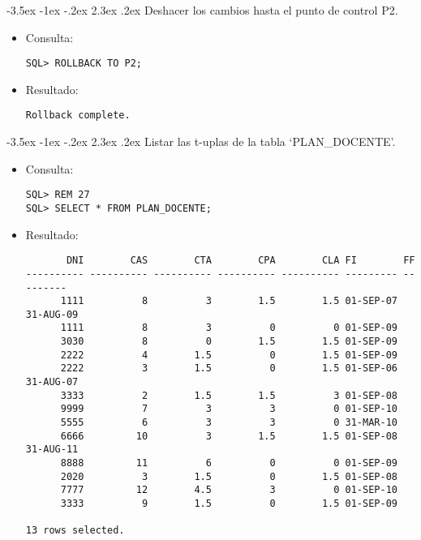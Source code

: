 \documentclass[11pt]{report}
\makeatletter
\renewcommand\chapter{\@startsection{chapter}{0}{\z@}%
    {-3.5ex \@plus -1ex \@minus -.2ex}%
    {2.3ex \@plus.2ex}%
    {\normalfont\Large\bfseries}}
\makeatother
\begin{document}
\chapter{Deshacer los cambios hasta el punto de control P2.}
\begin{itemize}
  \item Consulta:
  \begin{verbatim}
SQL> ROLLBACK TO P2;
  \end{verbatim}
  \item{Resultado:}
  \begin{verbatim}
Rollback complete.
  \end{verbatim}
\end{itemize}

\chapter{Listar las t-uplas de la tabla ‘PLAN\_DOCENTE’.}
\begin{itemize}
  \item Consulta:
  \begin{verbatim}
SQL> REM 27
SQL> SELECT * FROM PLAN_DOCENTE;
  \end{verbatim}

  \newpage

  \item{Resultado:}
  \begin{verbatim}
       DNI        CAS        CTA        CPA        CLA FI        FF                                 
---------- ---------- ---------- ---------- ---------- --------- ---------                          
      1111          8          3        1.5        1.5 01-SEP-07 31-AUG-09                          
      1111          8          3          0          0 01-SEP-09                                    
      3030          8          0        1.5        1.5 01-SEP-09                                    
      2222          4        1.5          0        1.5 01-SEP-09                                    
      2222          3        1.5          0        1.5 01-SEP-06 31-AUG-07                          
      3333          2        1.5        1.5          3 01-SEP-08                                    
      9999          7          3          3          0 01-SEP-10                                    
      5555          6          3          3          0 31-MAR-10                                    
      6666         10          3        1.5        1.5 01-SEP-08 31-AUG-11                          
      8888         11          6          0          0 01-SEP-09                                    
      2020          3        1.5          0        1.5 01-SEP-08                                    
      7777         12        4.5          3          0 01-SEP-10                                    
      3333          9        1.5          0        1.5 01-SEP-09                                    

13 rows selected.
  \end{verbatim}
\end{itemize}
\end{document}
